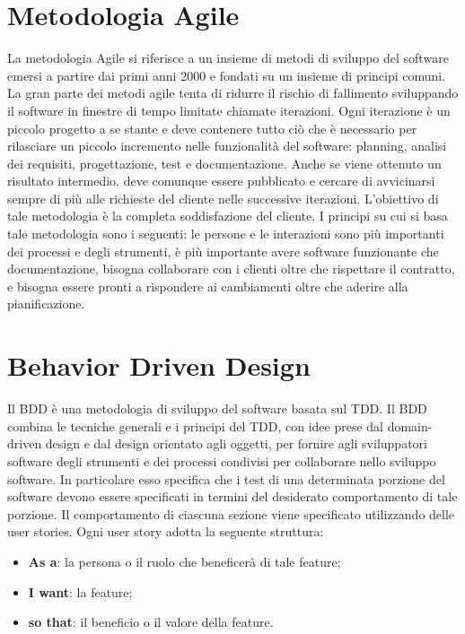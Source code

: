 \section{Metodologia Agile}
La metodologia Agile si riferisce a un insieme di metodi di sviluppo del software emersi a partire dai primi anni 2000 e fondati su un insieme di principi comuni. La gran parte dei metodi agile tenta di ridurre il rischio di fallimento sviluppando il software in finestre di tempo limitate chiamate iterazioni. Ogni iterazione è un piccolo progetto a se stante e deve contenere tutto ciò che è necessario per rilasciare un piccolo incremento nelle funzionalità del software: planning, analisi dei requisiti, progettazione, test e documentazione. Anche se viene ottenuto un risultato intermedio, deve comunque essere pubblicato e cercare di avvicinarsi sempre di più alle richieste del cliente nelle successive iterazioni. L'obiettivo di tale metodologia è la completa soddisfazione del cliente. I principi su cui si basa tale metodologia sono i seguenti: le persone e le interazioni sono più importanti dei processi e degli strumenti, è più importante avere software funzionante che documentazione, bisogna collaborare con i clienti oltre che rispettare il contratto, e bisogna essere pronti a rispondere ai cambiamenti oltre che aderire alla pianificazione.
\section{Behavior Driven Design}
Il BDD è una metodologia di sviluppo del software basata sul TDD. Il BDD combina le tecniche generali e i principi del TDD, con idee prese dal domain-driven design e dal design orientato agli oggetti, per fornire agli sviluppatori software degli strumenti e dei processi condivisi per collaborare nello sviluppo software. In particolare esso specifica che i test di una determinata porzione del software devono essere specificati in termini del desiderato comportamento di tale porzione. Il comportamento di ciascuna sezione viene specificato utilizzando delle user stories. Ogni user story adotta la seguente struttura:
\begin{itemize}
\item \textbf{As a}: la persona o il ruolo che beneficerà di tale feature;
\item \textbf{I want}: la feature;
\item \textbf{so that}: il beneficio o il valore della feature.
\end{itemize}
